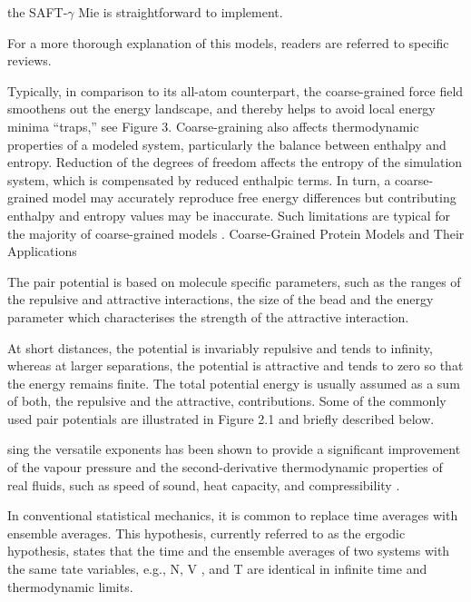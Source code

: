 the SAFT-$\gamma$ Mie is straightforward to implement.

For a more thorough explanation of this models, readers are referred to specific reviews. 


Typically, in comparison to its all-atom counterpart, the coarse-grained force field smoothens out the energy landscape, and thereby helps to avoid local energy minima “traps,” see Figure 3. Coarse-graining also affects thermodynamic properties of a modeled system, particularly the balance between enthalpy and entropy. Reduction of the degrees of freedom affects the entropy of the simulation system, which is compensated by reduced enthalpic terms. In turn, a coarse-grained model may accurately reproduce free energy differences but contributing enthalpy and entropy values may be inaccurate. Such limitations are typical for the majority of coarse-grained models \cite{kmiecik2016}. 
Coarse-Grained Protein Models and Their Applications







The pair potential is based on molecule specific
parameters, such as the ranges of the repulsive and attractive interactions, the size of
the bead and the energy parameter which characterises the strength of the attractive interaction.

At short distances, the potential is
invariably repulsive and tends to infinity, whereas at larger separations, the potential is
attractive and tends to zero so that the energy remains finite. The total potential energy
is usually assumed as a sum of both, the repulsive and the attractive, contributions. Some
of the commonly used pair potentials are illustrated in Figure 2.1 and briefly described
below.

sing the versatile exponents has been shown to provide
a significant improvement of the vapour pressure and the second-derivative thermodynamic
properties of real fluids, such as speed of sound, heat capacity, and compressibility \cite{avendano2011,lafitte2013,lafitte2006}.

In conventional statistical mechanics, it is common to replace time
averages with ensemble averages. This hypothesis, currently referred to as the ergodic
hypothesis, states that the time and the ensemble averages of two systems with the same tate variables, e.g., N, V , and T are identical in infinite time and thermodynamic limits.

